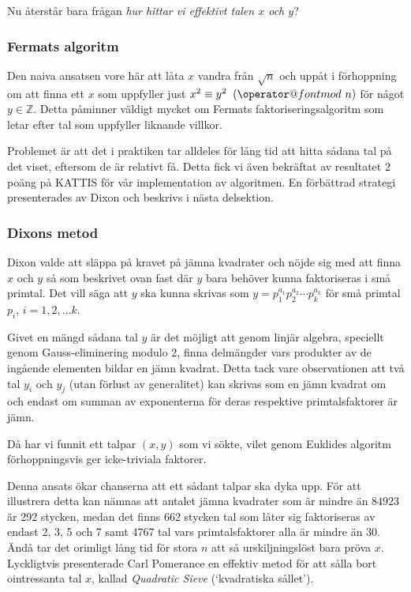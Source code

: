 \documentclass[a4paper,12pt]{article}
\makeatletter
\def\imod#1{\allowbreak\mkern10mu({\operator@font mod}\,\,#1)}
\renewcommand{\*}{\ensuremath{\cdot}}
\makeatother
\begin{document}
Nu återstår bara frågan \emph{hur hittar vi effektivt talen $x$ och $y$}?

\subsubsection{Fermats algoritm}

Den naiva ansatsen vore här att låta $x$ vandra från $\sqrt{n}$ och uppåt i
förhoppning om att finna ett $x$ som uppfyller just $x^2 \equiv y^2 \imod{n}$
för något $y \in \mathbb{Z}$. Detta påminner väldigt mycket om Fermats
faktoriseringsalgoritm som letar efter tal som uppfyller liknande villkor.

Problemet är att det i praktiken tar alldeles för lång tid att hitta sådana tal
på det viset, eftersom de är relativt få. Detta fick vi även bekräftat av
resultatet 2 poäng på KATTIS för vår implementation av algoritmen. En förbättrad
strategi presenterades av Dixon och beskrivs i nästa delsektion.


\subsubsection{Dixons metod}

Dixon valde att släppa på kravet på jämna kvadrater och nöjde sig med att finna
$x$ och $y$ så som beskrivet ovan fast där $y$ bara behöver kunna faktoriseras
i små primtal. Det vill säga att $y$ ska kunna skrivas som $y =
p_1^{a_1}p_2^{a_2} \cdots p_k^{a_k}$ för små primtal $p_i$, $i = 1, 2, \dots k$.

Givet en mängd sådana tal $y$ är det möjligt att genom linjär algebra, speciellt
genom Gauss-eliminering modulo 2, finna delmängder vars produkter av de ingående
elementen bildar en jämn kvadrat. Detta tack vare observationen att två tal
$y_i$ och $y_j$ (utan förlust av generalitet) kan skrivas som en jämn kvadrat om
och endast om summan av exponenterna för deras respektive primtalsfaktorer är
jämn.

Då har vi funnit ett talpar $(x, y)$ som vi sökte, vilet genom Euklides algoritm
förhoppningsvis ger icke-triviala faktorer.

Denna ansats ökar chanserna att ett sådant talpar ska dyka upp. För att
illustrera detta kan nämnas att antalet jämna kvadrater som är mindre än $84923$
är 292 stycken, medan det finns 662 stycken tal som låter sig faktoriseras av
endast 2, 3, 5 och 7 samt 4767 tal vars primtalsfaktorer alla är mindre än 30.
Ändå tar det orimligt lång tid för stora $n$ att så urskiljningslöst bara pröva
$x$. Lyckligtvis presenterade Carl Pomerance en effektiv metod för att sålla
bort ointressanta tal $x$, kallad \emph{Quadratic Sieve} (`kvadratiska sållet').
\end{document}
